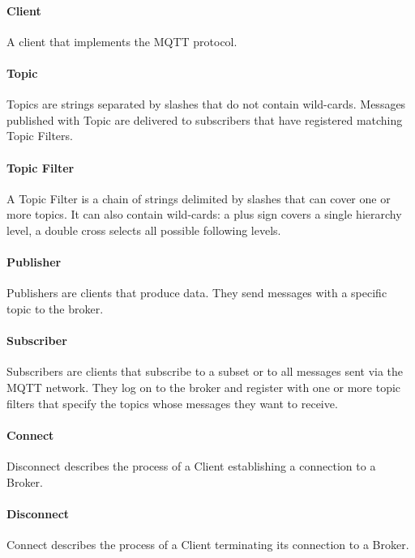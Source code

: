 \paragraph{Client}
A client that implements the MQTT protocol. 
\paragraph{Topic}
Topics are strings separated by slashes that do not contain wild-cards.
Messages published with Topic are delivered to subscribers that have registered matching Topic Filters.
\paragraph{Topic Filter}
A Topic Filter is a chain of strings delimited by slashes that 
can cover one or more topics. 
It can also contain wild-cards: a plus sign covers a single hierarchy level, a double cross selects all possible following levels.
\paragraph{Publisher}
Publishers are clients that produce data.
They send messages with a specific topic to the broker.
\paragraph{Subscriber}
Subscribers are clients that subscribe to a subset or to all messages sent via the
MQTT network.
They log on to the broker and register with one or more topic filters that specify the topics whose messages they want to receive.
\paragraph{Connect}
Disconnect describes the process of a Client establishing a connection to a Broker.
\paragraph{Disconnect}
Connect describes the process of a Client terminating its connection to a Broker.


